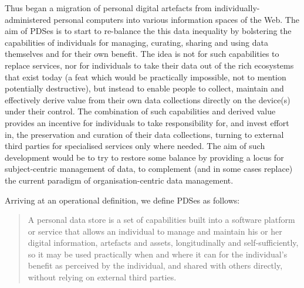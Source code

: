 \documentclass{sig-alternate}
\begin{document}
Thus began a migration of personal digital artefacts from individually-administered personal computers into various information spaces of the Web. The aim of PDSes is to start to re-balance the this data inequality by bolstering the capabilities of individuals for managing, curating, sharing and using data themselves and for their own benefit. The idea is not for such capabilities to replace services, nor for individuals to take their data out of the rich ecosystems that exist today (a feat which would be practically impossible, not to mention potentially destructive), but instead to enable people to collect, maintain and effectively derive value from their own data collections directly on the device(s) under their control. The combination of such capabilities and derived value provides an incentive for individuals to take responsibility for, and invest effort in, the preservation and curation of their data collections, turning to external third parties for specialised services only where needed. The aim of such development would be to try to restore some balance by providing a locus for subject-centric management of data, to complement (and in some cases replace) the current paradigm of organisation-centric data management.

Arriving at an operational definition, we define PDSes as follows:

\begin{quote}

	A personal data store is a set of capabilities built into a software platform or service that allows an individual to manage and maintain his or her digital information, artefacts and assets, longitudinally and self-sufficiently, so it may be used practically when and where it can for the individual's benefit as perceived by the individual, and shared with others directly, without relying on external third parties. 

\end{quote}
\end{document}

